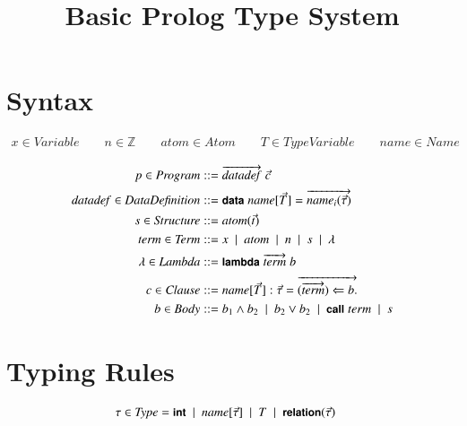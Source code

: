\documentclass[10pt]{article}
\newcommand{\alt}{\ \mid\ }
\newcommand{\mtt}[1]{\ensuremath{\mathit{#1}}}
\newcommand{\anywhere}[1]{\ensuremath{\mbox{#1}}}
\newcommand{\kw}[1]{\anywhere{\sffamily{\bfseries\small {#1}}}}
\newcommand{\term}{\ensuremath{\mtt{term}}\xspace}
\newcommand{\atom}{\ensuremath{\mtt{atom}}\xspace}
\newcommand{\name}{\ensuremath{\mtt{name}}\xspace}
\newcommand{\datadef}{\ensuremath{\mtt{datadef}}\xspace}
\begin{document}
\title{Basic Prolog Type System}
\author{}
\date{}

\maketitle

\section{Syntax}

\begin{gather*}
  x \in \mtt{Variable} \qquad n \in \mathbb{Z} \qquad \atom \in \mtt{Atom} \qquad T \in \mtt{TypeVariable} \qquad \name \in \mtt{Name}
\end{gather*}

\begin{align*}
  p \in \mtt{Program} &::= \overrightarrow{\datadef}\;\vec{c}
  \\
  \datadef \in \mtt{DataDefinition} &::= \kw{data}\; \name[\vec{T}] = \overrightarrow{\name_i(\vec{\tau})}
  \\
  s \in \mtt{Structure} &::= \atom(\vec{t})
  \\
  \term \in \mtt{Term} &::= x \alt \atom \alt n \alt s \alt \lambda
  \\
  \lambda \in \mtt{Lambda} &::= \kw{lambda}\;\overrightarrow{\term}\;b
  \\
  c \in \mtt{Clause} &::= \name[\vec{T}] : \vec{\tau} = \overrightarrow{(\overrightarrow{\term}) \Leftarrow b.}
  \\
  b \in \mtt{Body} &::= b_1 \land b_2 \alt b_2 \lor b_2
  \alt \kw{call}\;term \alt s
\end{align*}

\section{Typing Rules}
\begin{align*}
  \tau \in \mtt{Type} &= \kw{int} \alt \name[\vec{\tau}] \alt T \alt \kw{relation}(\vec{\tau})
\end{align*}
\end{document}
